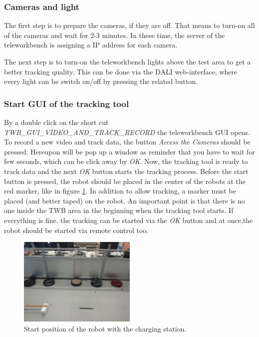 \documentclass[twoside]{article}
\begin{document}
\subsubsection{Cameras and light}
The first step is to prepare the cameras, if they are off. That means to turn-on all of the cameras and wait for 2-3 minutes. In these time, the server of the teleworkbench is assigning a IP address for each camera.

The next step is to turn-on the teleworkbench lights above the test area to get a better tracking quality. This can be done via the DALI web-interface, where every light can be switch on/off by pressing the related button.

\subsubsection{Start GUI of the tracking tool}
By a double click on the short cut \textit{TWB\_GUI\_VIDEO\_AND\_TRACK\_RECORD} the teleworkbench GUI opens. To record a new video and track data, the button \textit{Access the Cameras} should be pressed. Hereupon will be pop up a window as reminder that you have to wait for few seconds, which can be click away by \textit{OK}. Now, the tracking tool is ready to track data and the next \textit{OK} button starts the tracking process. Before the start button is pressed, the robot should be placed in the center of the robots at the red marker, like in figure \ref{fig:place}. In addition to allow tracking, a marker must be placed (and better taped) on the robot. An important point is that there is no one inside the TWB area in the beginning when the tracking tool starts. If everything is fine, the tracking can be started via the \textit{OK} button and at once,the robot should be started via remote control too.

\begin{figure} [H]
	\begin{center}
		\includegraphics[width=0.5\textwidth]{pictures/place.jpg}
		\caption{Start position of the robot with the charging station.}
		\label{fig:place}
	\end{center}
\end{figure}
\end{document}
